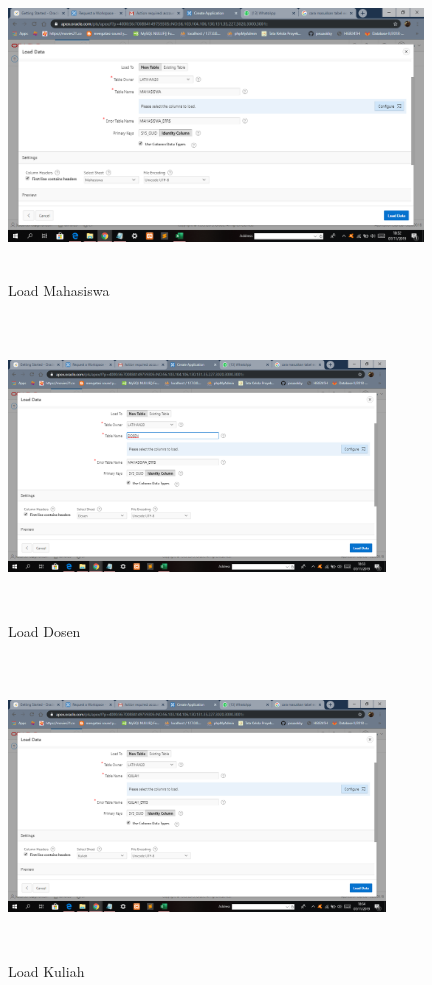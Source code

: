 \begin{enumerate}
\begin{figure}[!htbp]
\centering
\includegraphics[width=11cm,height=8cm]{figures/10loadmahasiswa.png}
\caption{Load Mahasiswa}
\label{penanda}
\end{figure}

\begin{figure}[!htbp]
\centering
\includegraphics[width=10cm,height=8cm]{figures/11loaddosen.png}
\caption{Load Dosen}
\label{penanda}
\end{figure}

\begin{figure}[!htbp]
\centering
\includegraphics[width=10cm,height=8cm]{figures/12loadkuliah.png}
\caption{Load Kuliah}
\label{penanda}
\end{figure}


\end{enumerate}
